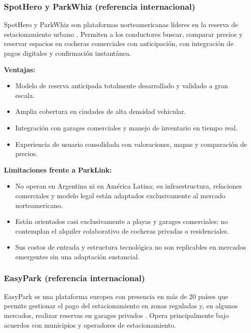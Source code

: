 \subsubsection{SpotHero y ParkWhiz (referencia internacional)}

SpotHero y ParkWhiz son plataformas norteamericanas líderes en la reserva de estacionamiento urbano \autocite{spothero}. Permiten a los conductores buscar, comparar precios y reservar espacios en cocheras comerciales con anticipación, con integración de pagos digitales y confirmación instantánea.

\textbf{Ventajas:}
\begin{itemize}
    \item Modelo de reserva anticipada totalmente desarrollado y validado a gran escala.
    \item Amplia cobertura en ciudades de alta densidad vehicular.
    \item Integración con garages comerciales y manejo de inventario en tiempo real.
    \item Experiencia de usuario consolidada con valoraciones, mapas y comparación de precios.
\end{itemize}

\textbf{Limitaciones frente a ParkLink:}
\begin{itemize}
    \item No operan en Argentina ni en América Latina; su infraestructura, relaciones comerciales y modelo legal están adaptados exclusivamente al mercado norteamericano.
    \item Están orientados casi exclusivamente a playas y garages comerciales; no contemplan el alquiler colaborativo de cocheras privadas o residenciales.
    \item Sus costos de entrada y estructura tecnológica no son replicables en mercados emergentes sin una adaptación sustancial.
\end{itemize}

\subsubsection{EasyPark (referencia internacional)}

EasyPark es una plataforma europea con presencia en más de 20 países que permite gestionar el pago del estacionamiento en zonas reguladas y, en algunos mercados, realizar reservas en garages privados \autocite{easypark}. Opera principalmente bajo acuerdos con municipios y operadores de estacionamiento.

